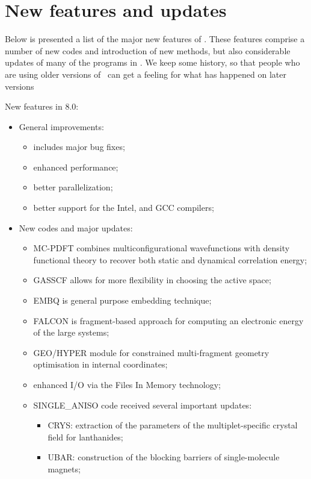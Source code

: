 
\section{New features and updates}

Below is presented a list of the major new features of \molcas. 
These features comprise a number of new codes and
introduction of new methods, but also considerable updates of many of the
programs in \molcas. We keep some history, so that people who are using older
versions of \molcas\ can get a feeling for what has happened on later versions

New features in 8.0:
\begin{itemize}
\item General improvements:
\begin{itemize}
\item includes major bug fixes;
\item enhanced performance;
\item better parallelization;
\item better support for the Intel, and GCC compilers;
\end{itemize}
\item New codes and major updates:
\begin{itemize}
\item MC-PDFT combines multiconfigurational wavefunctions with density functional theory to recover both static and dynamical correlation energy;
\item GASSCF allows for more flexibility in choosing the active space;
\item EMBQ is general purpose embedding technique;
\item FALCON is fragment-based approach for computing an electronic energy of the large systems;
\item GEO/HYPER module for constrained multi-fragment geometry optimisation in internal coordinates;
\item enhanced I/O via the Files In Memory technology;
\item SINGLE\_ANISO code received several important updates:
    \begin{itemize}
       \item CRYS: extraction of the parameters of the multiplet-specific crystal field for lanthanides;
       \item UBAR: construction of the blocking barriers of single-molecule magnets;

\end{itemize}
\end{itemize}
\end{itemize}
